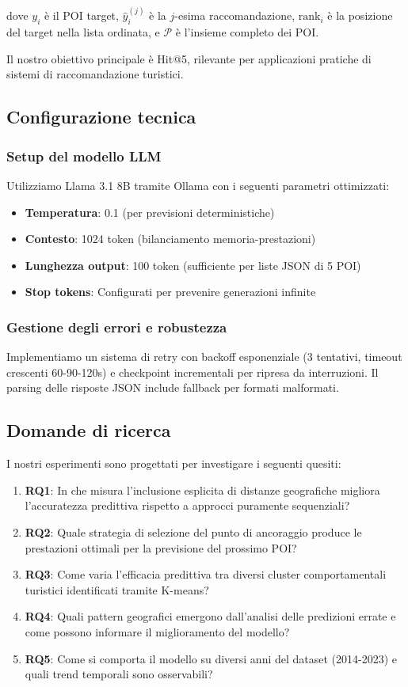 dove $y_i$ è il POI target, $\hat{y}_i^{(j)}$ è la $j$-esima raccomandazione, $\text{rank}_i$ è la posizione del target nella lista ordinata, e $\mathcal{P}$ è l'insieme completo dei POI.

Il nostro obiettivo principale è Hit@5, rilevante per applicazioni pratiche di sistemi di raccomandazione turistici.

\subsection{Configurazione tecnica}

\subsubsection{Setup del modello LLM}
Utilizziamo Llama 3.1 8B tramite Ollama con i seguenti parametri ottimizzati:
\begin{itemize}
\item \textbf{Temperatura}: 0.1 (per previsioni deterministiche)
\item \textbf{Contesto}: 1024 token (bilanciamento memoria-prestazioni)
\item \textbf{Lunghezza output}: 100 token (sufficiente per liste JSON di 5 POI)
\item \textbf{Stop tokens}: Configurati per prevenire generazioni infinite
\end{itemize}

\subsubsection{Gestione degli errori e robustezza}
Implementiamo un sistema di retry con backoff esponenziale (3 tentativi, timeout crescenti 60-90-120s) e checkpoint incrementali per ripresa da interruzioni. Il parsing delle risposte JSON include fallback per formati malformati.

\subsection{Domande di ricerca}

I nostri esperimenti sono progettati per investigare i seguenti quesiti:

\begin{enumerate}
\item \textbf{RQ1}: In che misura l'inclusione esplicita di distanze geografiche migliora l'accuratezza predittiva rispetto a approcci puramente sequenziali?
\item \textbf{RQ2}: Quale strategia di selezione del punto di ancoraggio produce le prestazioni ottimali per la previsione del prossimo POI?
\item \textbf{RQ3}: Come varia l'efficacia predittiva tra diversi cluster comportamentali turistici identificati tramite K-means?
\item \textbf{RQ4}: Quali pattern geografici emergono dall'analisi delle predizioni errate e come possono informare il miglioramento del modello?
\item \textbf{RQ5}: Come si comporta il modello su diversi anni del dataset (2014-2023) e quali trend temporali sono osservabili?
\end{enumerate}

